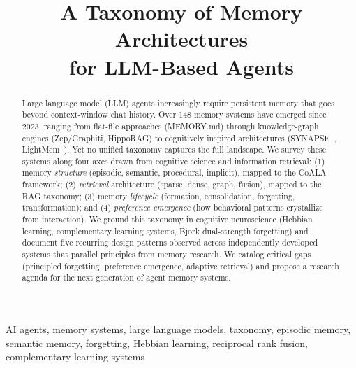 \documentclass[conference]{IEEEtran}
\begin{document}
\title{A Taxonomy of Memory Architectures\\for LLM-Based Agents}

\author{
}

\maketitle
\pagestyle{plain}

\begin{abstract}
Large language model (LLM) agents increasingly require persistent memory
that goes beyond context-window chat history. Over 148 memory systems have
emerged since 2023, ranging from flat-file approaches (MEMORY.md) through
knowledge-graph engines (Zep/Graphiti, HippoRAG) to cognitively inspired
architectures (SYNAPSE~\cite{jiang2026synapse}, LightMem~\cite{fang2025lightmem}). Yet no unified taxonomy captures the full
landscape. We survey these systems along four axes drawn from cognitive
science and information retrieval: (1) memory \emph{structure} (episodic,
semantic, procedural, implicit), mapped to the CoALA framework; (2)
\emph{retrieval} architecture (sparse, dense, graph, fusion), mapped to
the RAG taxonomy; (3) memory \emph{lifecycle} (formation, consolidation,
forgetting, transformation); and (4) \emph{preference emergence} (how
behavioral patterns crystallize from interaction). We ground this taxonomy
in cognitive neuroscience (Hebbian learning, complementary learning
systems, Bjork dual-strength forgetting) and document five recurring
design patterns observed across independently developed systems that
parallel principles from memory research. We catalog critical gaps
(principled forgetting, preference emergence, adaptive retrieval) and
propose a research agenda for the next generation of agent memory systems.
\end{abstract}

\begin{IEEEkeywords}
AI agents, memory systems, large language models, taxonomy, episodic
memory, semantic memory, forgetting, Hebbian learning, reciprocal rank
fusion, complementary learning systems
\end{IEEEkeywords}
\end{document}
